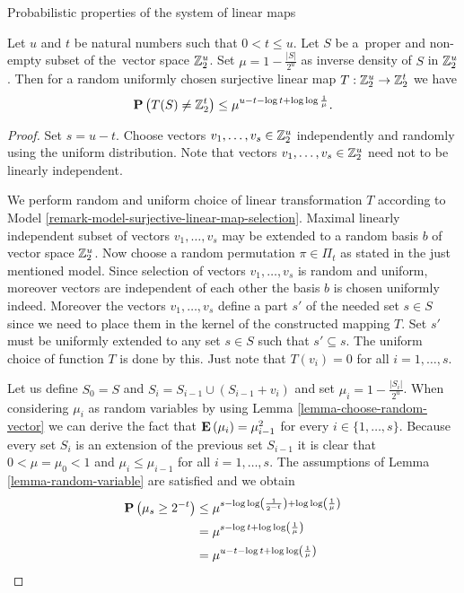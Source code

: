\begin{section}{Probabilistic properties of the system of linear maps}
\begin{theorem}
\label{theorem-linear-function-set-onto}
Let $u$ and $t$ be natural numbers such that $0 < t \leq u$. Let $S$ be a~proper and non-empty subset of the~vector space $\mathbb{Z}_{2}^{u}$. Set $\mu = 1 - \frac{|S|}{2^u}$ as inverse density of $S$ in $\mathbb{Z}_{2}^{u}$. Then for a random uniformly chosen surjective linear map $T: \mathbb{Z}_{2}^{u} \rightarrow \mathbb{Z}_{2}^{t}$ we have
\[
	\mathbf{P}\left(T(S) \neq \mathbb{Z}_{2}^{t}\right) \leq \mu^{u - t - \log t + \log \log \frac{1}{\mu}} \textit{.}
\]
\end{theorem}
\begin{proof}
Set $s = u - t$. Choose vectors $v_1, \dots, v_s \in \mathbb{Z}_{2}^{u}$ independently and randomly using the uniform distribution. Note that vectors $v_1, \dots, v_s \in \mathbb{Z}_{2}^{u}$ need not to be linearly independent.

We perform random and uniform choice of linear transformation $T$ according to Model \ref{remark-model-surjective-linear-map-selection}. Maximal linearly independent subset of vectors $v_1, \dots, v_s$ may be extended to a random basis $b$ of vector space $\mathbb{Z}_{2}^{u}$. Now choose a random permutation $\pi \in \Pi_t$ as stated in the just mentioned model. Since selection of vectors $v_1, \dots, v_s$ is random and uniform, moreover vectors are independent of each other the basis $b$ is chosen uniformly indeed. Moreover the vectors $v_1, \dots, v_s$ define a part $s'$ of the needed set $s \in S$ since we need to place them in the kernel of the constructed mapping $T$. Set $s'$ must be uniformly extended to any set $s \in S$ such that $s' \subseteq s$. The uniform choice of function $T$ is done by this. Just note that $T(v_i) = 0$ for all $i = 1, \dots, s$.	

Let us define $S_0 = S$ and $S_i = S_{i - 1} \cup (S_{i - 1} + v_i)$ and set $\mu_i = 1 - \frac{|S_i|}{2 ^ u}$. When considering $\mu_i$ as random variables by using Lemma \ref{lemma-choose-random-vector} we can derive the fact that $\mathbf{E}\left(\mu_i\right) = \mu_{i - 1} ^ 2$ for every $i \in \{1, \dots, s \}$. Because every set $S_i$ is an extension of the previous set $S_{i - 1}$ it is clear that $0 < \mu = \mu_0 < 1$ and $\mu_i \leq \mu_{i - 1}$ for all $i = 1, \dots, s$. The assumptions of Lemma \ref{lemma-random-variable} are satisfied and we obtain
\[
\begin{split}
\mathbf{P}\left(\mu_s \geq 2 ^ {-t}\right) 
	& \leq \mu ^ {s - \log \log \left(\frac{1}{2 ^ {-t}}\right) + \log \log \left( \frac{1}{\mu} \right)} \\
	& = \mu ^ {s - \log t + \log \log \left(\frac{1}{\mu}\right)} \\
	& = \mu ^ {u - t - \log t + \log \log \left(\frac{1}{\mu}\right)}
\end{split}
\]


\end{proof}
\end{section}

